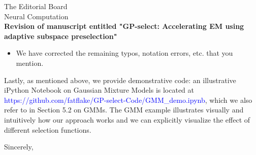\documentclass[10pt]{letter}
\newcommand{\rev}[1]{\textcolor{blue}{#1}}
\begin{document}
\begin{letter}{
The Editorial Board\\
Neural Computation\\
\vspace{10mm}
\textbf{Revision of manuscript entitled "GP-select: Accelerating EM using adaptive
subspace preselection"}
}
\begin{itemize}[topsep=3pt,itemsep=2ex,partopsep=1ex,parsep=1ex]
        We have enlarged Figure 4 and modified and enlarged Figure 5 for easier viewing of the image components.

    \item We have corrected the remaining typos, notation errors, etc. that you mention.
    



\end{itemize}

Lastly, as mentioned above, we provide demonstrative code: an illustrative iPython Notebook on Gaussian Mixture Models is located at \rev{https://github.com/fatflake/GP-select-Code/GMM\_demo.ipynb}, which we also refer to in Section 5.2 on GMMs. The GMM example illustrates visually and intuitively how our approach works and we can explicitly visualize the effect of different selection functions. 

\noindent \vspace{.1in}\closing{Sincerely,\vspace{-5mm}}

\end{letter}
\end{document}

